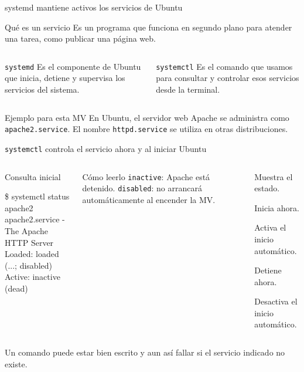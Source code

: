 \documentclass[aspectratio=169,10pt,c]{beamer}
\begin{document}
\begin{frame}{systemd mantiene activos los servicios de Ubuntu}
\begin{block}{Qué es un servicio}
\small Es un programa que funciona en segundo plano para atender una tarea, como publicar una página web.
\end{block}
\begin{columns}[T,onlytextwidth]
\begin{exampleblock}{\texttt{systemd}}
\small Es el componente de Ubuntu que inicia, detiene y supervisa los servicios del sistema.
\end{exampleblock}
\begin{exampleblock}{\texttt{systemctl}}
\small Es el comando que usamos para consultar y controlar esos servicios desde la terminal.
\end{exampleblock}
\end{columns}
\begin{alertblock}{Ejemplo para esta MV}
\small En Ubuntu, el servidor web Apache se administra como \texttt{apache2.service}. El nombre \texttt{httpd.service} se utiliza en otras distribuciones.
\end{alertblock}
\end{frame}

\begin{frame}{\texttt{systemctl} controla el servicio ahora y al iniciar Ubuntu}
\begin{columns}[T,onlytextwidth]
\begin{exampleblock}{Consulta inicial}
\begin{terminal}\footnotesize
\$ systemctl status apache2\\
apache2.service - The Apache HTTP Server\\
Loaded: loaded (...; disabled)\\
Active: inactive (dead)
\end{terminal}
\end{exampleblock}
\begin{alertblock}{Cómo leerlo}
\small \texttt{inactive}: Apache está detenido. \texttt{disabled}: no arrancará automáticamente al encender la MV.
\end{alertblock}
\begin{description}
\small
  \item[\texttt{status}] Muestra el estado.
  \item[\texttt{start}] Inicia ahora.
  \item[\texttt{enable}] Activa el inicio automático.
  \item[\texttt{stop}] Detiene ahora.
  \item[\texttt{disable}] Desactiva el inicio automático.
\end{description}
\end{columns}
\small Un comando puede estar bien escrito y aun así fallar si el servicio indicado no existe.
\end{frame}
\end{document}
